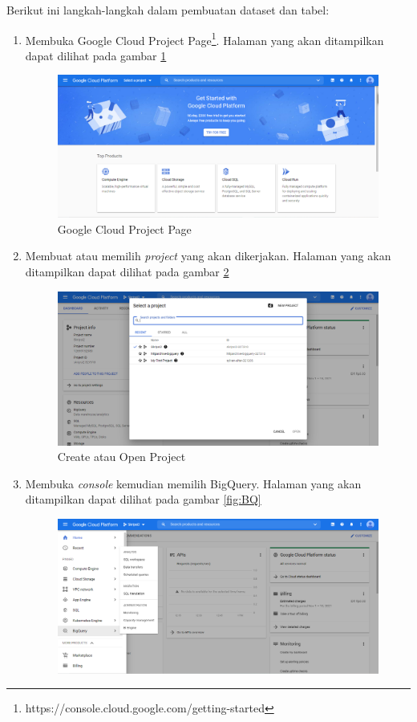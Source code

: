 Berikut ini langkah-langkah dalam pembuatan dataset dan tabel:
\begin{enumerate}
	\item Membuka Google Cloud Project Page\footnote{https://console.cloud.google.com/getting-started}. Halaman yang akan ditampilkan dapat dilihat pada gambar \ref{fig:GCP}
	\begin{figure}[H]
		\centering  
		\includegraphics[scale=0.45]{Gambar/open_GCP.PNG}  
		\caption{Google Cloud Project Page} 
		\label{fig:GCP} 
	\end{figure}
	\item Membuat atau memilih \textit{project} yang akan dikerjakan. Halaman yang akan ditampilkan dapat dilihat pada gambar \ref{fig:create_or_open}
	\begin{figure}[H]
		\centering  
		\includegraphics[scale=0.45]{Gambar/pilih_project.PNG}  
		\caption{Create atau Open Project} 
		\label{fig:create_or_open} 
	\end{figure}
	\item Membuka \textit{console} kemudian memilih BigQuery. Halaman yang akan ditampilkan dapat dilihat pada gambar \ref{fig:BQ}
	\begin{figure}[H]
		\centering  
		\includegraphics[scale=0.45]{Gambar/console_BigQuery.PNG}  

\end{figure}
\end{enumerate}

